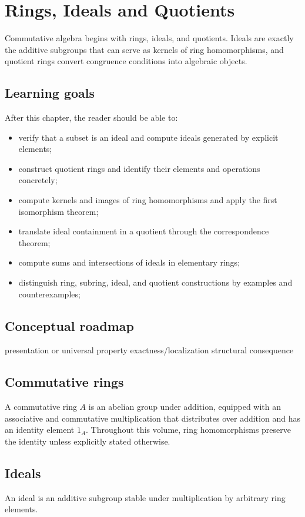 \chapter{Rings, Ideals and Quotients}
\label{ch:v01}

Commutative algebra begins with rings, ideals, and quotients. Ideals are exactly the additive subgroups that can serve as kernels of ring homomorphisms, and quotient rings convert congruence conditions into algebraic objects.

\section*{Learning goals}
After this chapter, the reader should be able to:
\begin{itemize}
\item verify that a subset is an ideal and compute ideals generated by explicit elements;
\item construct quotient rings and identify their elements and operations concretely;
\item compute kernels and images of ring homomorphisms and apply the first isomorphism theorem;
\item translate ideal containment in a quotient through the correspondence theorem;
\item compute sums and intersections of ideals in elementary rings;
\item distinguish ring, subring, ideal, and quotient constructions by examples and counterexamples;
\end{itemize}
\section*{Conceptual roadmap}
\volroadmap
  {presentation or universal property}
  {exactness/localization}
  {structural consequence}

\section{Commutative rings}
A commutative ring \(A\) is an abelian group under addition, equipped with an associative and commutative multiplication that distributes over addition and has an identity element \(1_A\). Throughout this volume, ring homomorphisms preserve the identity unless explicitly stated otherwise.

\section{Ideals}
An ideal is an additive subgroup stable under multiplication by arbitrary ring elements.

